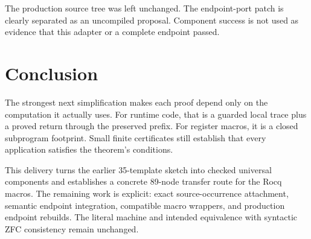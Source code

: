 The production source tree was left unchanged. The endpoint-port patch is clearly separated as an uncompiled proposal. Component success is not used as evidence that this adapter or a complete endpoint passed.

\section{Conclusion}
The strongest next simplification makes each proof depend only on the computation it actually uses. For runtime code, that is a guarded local trace plus a proved return through the preserved prefix. For register macros, it is a closed subprogram footprint. Small finite certificates still establish that every application satisfies the theorem's conditions.

This delivery turns the earlier 35-template sketch into checked universal components and establishes a concrete 89-node transfer route for the Rocq macros. The remaining work is explicit: exact source-occurrence attachment, semantic endpoint integration, compatible macro wrappers, and production endpoint rebuilds. The literal machine and intended equivalence with syntactic ZFC consistency remain unchanged.

\appendix
